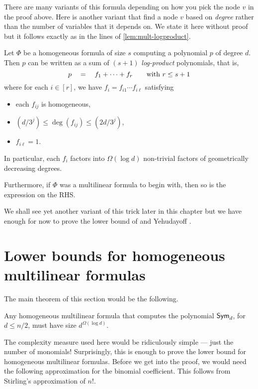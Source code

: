 There are many variants of this formula depending on how you pick the node $v$ in the proof above.
Here is another variant that find a node $v$ based on \emph{degree} rather than the number of variables that it depends on.
We state it here without proof but it follows exactly as in the lines of \autoref{lem:mult-logproduct}.

\begin{lemma}\label{lem:hom-logproduct}
  Let $\Phi$ be a homogeneous formula of size $s$ computing a polynomial $p$ of degree $d$.
Then $p$ can be written as a sum of $(s+1)$ \emph{log-product} polynomials, that is,
\[
p \quad = \quad f_1 + \cdots + f_{r}\quad\quad \text{with $r \leq s+1$}
\]
where for each $i \in [r]$, we have $f_i = f_{i1} \cdots f_{i\ell}$ satisfying
\begin{itemize}
\item each $f_{ij}$ is homogeneous,
\item $(d / 3^j) \leq \deg(f_{ij}) \leq (2d / 3^j)$,
\item $f_{i\ell} = 1$.
\end{itemize}
In particular, each $f_i$ factors into $\Omega(\log d)$ non-trivial factors of geometrically decreasing degrees. 

Furthermore, if $\Phi$ was a multilinear formula to begin with, then so is the expression on the RHS. 
\end{lemma}


We shall see yet another variant of this trick later in this chapter but we have enough for now to prove the lower bound of \Hrubes and Yehudayoff \cite{HY11a}. 

\section{Lower bounds for homogeneous multilinear formulas}

The main theorem of this section would be the following.

\begin{theorem}[\cite{HY11a}]\label{thm:Hrubes-Yehudayoff}
Any homogeneous multilinear formula that computes the polynomial $\operatorname{\mathsf{Sym}}_d$, for $d \leq n/2$, must have size $d^{\Omega(\log d)}$. 
\end{theorem}

The complexity measure used here would be ridiculously simple --- just the number of monomials!
Surprisingly, this is enough to prove the lower bound for homogeneous multilinear formulas. Before we get into the proof, we would need the following approximation for the binomial coefficient. This follows from Stirling's approximation of $n!$. 

